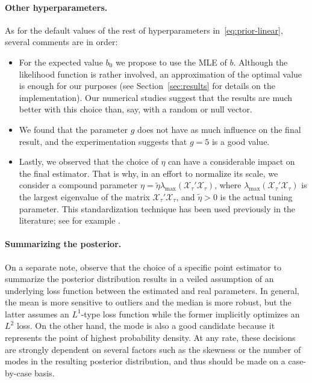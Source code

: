 \paragraph{Other hyperparameters.} As for the default values of the rest of hyperparameters in~\eqref{eq:prior-linear}, several comments are in order:
\begin{itemize}
  \item For the expected value \(b_0\) we propose to use the MLE of \(b\). Although the likelihood function is rather involved, an approximation of the optimal value is enough for our purposes (see Section~\ref{sec:results} for details on the implementation). Our numerical studies suggest that the results are much better with this choice than, say, with a random or null vector.
  \item We found that the parameter \(g\) does not have as much influence on the final result, and the experimentation suggests that \(g=5\) is a good value.
  \item Lastly, we observed that the choice of \(\eta\) can have a considerable impact on the final estimator. That is why, in an effort to normalize its scale, we consider a compound parameter \(\eta = \tilde \eta \lambda_{\max}(\mathcal X_\tau'\mathcal X_\tau)\), where \(\lambda_{\max}(\mathcal X_\tau'\mathcal X_\tau)\) is the largest eigenvalue of the matrix \(\mathcal X_\tau'\mathcal X_\tau\), and \(\tilde\eta > 0\) is the actual tuning parameter. This standardization technique has been used previously in the literature; see for example \citet{grollemund2019bayesian}.
\end{itemize}

\paragraph{Summarizing the posterior.} On a separate note, observe that the choice of a specific point estimator to summarize the posterior distribution results in a veiled assumption of an underlying loss function between the estimated and real parameters. In general, the mean is more sensitive to outliers and the median is more robust, but the latter assumes an \(L^1\)-type loss function while the former implicitly optimizes an \(L^2\) loss. On the other hand, the mode is also a good candidate because it represents the point of highest probability density. At any rate, these decisions are strongly dependent on several factors such as the skewness or the number of modes in the resulting posterior distribution, and thus should be made on a case-by-case basis. 


